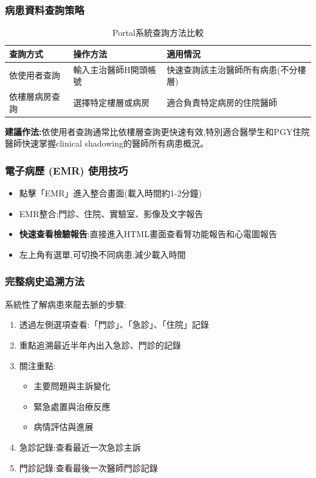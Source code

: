 \documentclass[12pt,a4paper]{article}
\begin{document}
\subsubsection{病患資料查詢策略}
\begin{table}[h]
    \centering
    \caption{Portal系統查詢方法比較}
    \begin{tabular}{p{3cm} p{5cm} p{6cm}}
        \toprule
        \textbf{查詢方式} & \textbf{操作方法} & \textbf{適用情況} \\
        \midrule
        依使用者查詢 & 輸入主治醫師H開頭帳號 & 快速查詢該主治醫師所有病患(不分樓層) \\
        依樓層病房查詢 & 選擇特定樓層或病房 & 適合負責特定病房的住院醫師 \\
        \bottomrule
    \end{tabular}
\end{table}

\begin{importantbox}
\textbf{建議作法:}依使用者查詢通常比依樓層查詢更快速有效,特別適合醫學生和PGY住院醫師快速掌握clinical shadowing的醫師所有病患概況。
\end{importantbox}

\subsubsection{電子病歷 (EMR) 使用技巧}
\begin{itemize}[nosep]
    \item 點擊「EMR」進入整合畫面(載入時間約1-2分鐘)
    \item EMR整合:門診、住院、實驗室、影像及文字報告
    \item \textbf{快速查看檢驗報告}:直接進入HTML畫面查看腎功能報告和心電圖報告
    \item 左上角有選單,可切換不同病患,減少載入時間
\end{itemize}

\subsubsection{完整病史追溯方法}
系統性了解病患來龍去脈的步驟:
\begin{enumerate}[nosep]
    \item 透過左側選項查看:「門診」、「急診」、「住院」記錄
    \item 重點追溯最近半年內出入急診、門診的記錄
    \item 關注重點:
        \begin{itemize}[nosep]
            \item 主要問題與主訴變化
            \item 緊急處置與治療反應
            \item 病情評估與進展
        \end{itemize}
    \item 急診記錄:查看最近一次急診主訴
    \item 門診記錄:查看最後一次醫師門診記錄
\end{enumerate}
\end{document}

